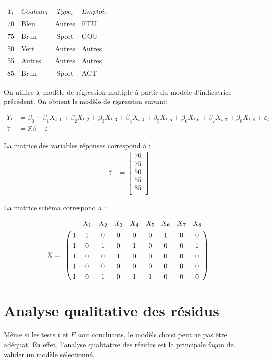 \documentclass[11pt,french]{report}
\begin{document}
\bigskip
\begin{center}
\begin{tabular}{|c|b|c|b|}
\hline
\rowcolor{codegray}
$Y_t$ & $Couleur_t$ & $Type_t$ & $Emploi_t$ \\
\hline
70 & Bleu & Autres & ETU \\
75 & Brun & Sport & GOU \\
50 & Vert & Autres & Autres \\
55 & Autres & Autres & Autres \\
85 & Brun & Sport & ACT \\
\hline
\end{tabular}
\end{center}
\bigskip

On utilise le modèle de régression multiple à partir du modèle d'indicatrice précédent. On obtient le modèle de régression suivant:

\begin{align*}
Y_t &= \beta_0 + \beta_1X_{t,1} + \beta_2X_{t,2} + \beta_3X_{t,3} 
+ \beta_4X_{t,4} + \beta_5X_{t,5} + \beta_6X_{t,6} + \beta_7X_{t,7} + \beta_8X_{t,8} + \varepsilon_t \\
\mathbb{Y} &= \mathbb{X}\mathbb{\beta} + \mathbb{\varepsilon}
\end{align*}

La matrice des variables réponses correspond à :
\begin{align*}
\mathbb{Y} &= 
\begin{bmatrix}
70 \\
75 \\
50 \\
55 \\
85 \\
\end{bmatrix}
\end{align*}

La matrice schéma correspond à :

\begin{align*}
\mathbb{X}
=
\bordermatrix { 
& &  X_1  & X_2 & X_3 & X_4 & X_5  & X_6 & X_7 & X_8 \cr 
& 1 & 1 & 0 & 0 & 0 & 0 & 1 & 0 & 0 \cr 
& 1 & 0 & 1 & 0 & 1 & 0 & 0 & 0 & 1 \cr 
& 1 & 0 & 0 & 1 & 0 & 0 & 0 & 0 & 0 \cr 
& 1 & 0 & 0 & 0 & 0 & 0 & 0 & 0 & 0 \cr 
& 1 & 0 & 1 & 0 & 1 & 1 & 0 & 0 & 0 \cr 
}
\end{align*}

\section{Analyse qualitative des résidus}
Même si les tests $t$ et $F$ sont concluants, le modèle choisi peut ne pas être adéquat. En effet, l'analyse qualitative des résidus est la principale façon de valider un modèle sélectionné. 
\end{document}
